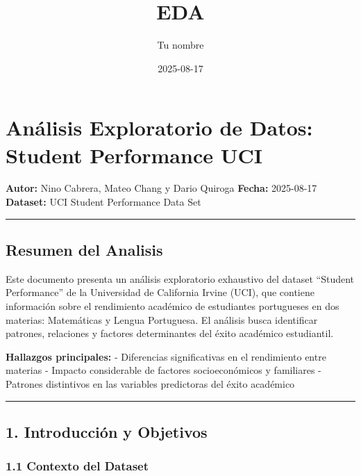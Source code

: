 \documentclass[
]{book}
\title{EDA}
\author{Tu nombre}
\date{2025-08-17}
\begin{document}
\maketitle

{
\setcounter{tocdepth}{1}
\tableofcontents
}
\chapter{Análisis Exploratorio de Datos: Student Performance UCI}\label{anuxe1lisis-exploratorio-de-datos-student-performance-uci}

\textbf{Autor:} Nino Cabrera, Mateo Chang y Dario Quiroga
\textbf{Fecha:} 2025-08-17\\
\textbf{Dataset:} UCI Student Performance Data Set

\begin{center}\rule{0.5\linewidth}{0.5pt}\end{center}

\section{Resumen del Analisis}\label{resumen-del-analisis}

Este documento presenta un análisis exploratorio exhaustivo del dataset ``Student Performance'' de la Universidad de California Irvine (UCI), que contiene información sobre el rendimiento académico de estudiantes portugueses en dos materias: Matemáticas y Lengua Portuguesa. El análisis busca identificar patrones, relaciones y factores determinantes del éxito académico estudiantil.

\textbf{Hallazgos principales:}
- Diferencias significativas en el rendimiento entre materias
- Impacto considerable de factores socioeconómicos y familiares
- Patrones distintivos en las variables predictoras del éxito académico

\begin{center}\rule{0.5\linewidth}{0.5pt}\end{center}

\section{1. Introducción y Objetivos}\label{introducciuxf3n-y-objetivos}

\subsection{1.1 Contexto del Dataset}\label{contexto-del-dataset}
\end{document}
